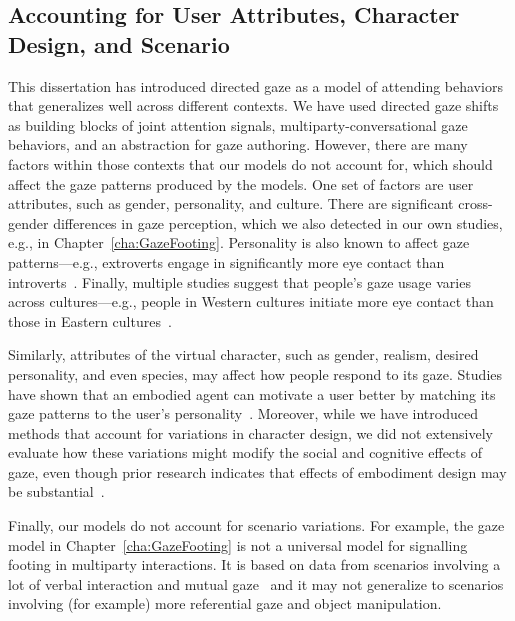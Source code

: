 \subsection{Accounting for User Attributes, Character Design, and Scenario}

This dissertation has introduced directed gaze as a model of attending behaviors that generalizes well across different contexts. We have used directed gaze shifts as building blocks of joint attention signals, multiparty-conversational gaze behaviors, and an abstraction for gaze authoring. However, there are many factors within those contexts that our models do not account for, which should affect the gaze patterns produced by the models. One set of factors are user attributes, such as gender, personality, and culture. There are significant cross-gender differences in gaze perception, which we also detected in our own studies, e.g., in Chapter~\ref{cha:GazeFooting}. Personality is also known to affect gaze patterns---e.g., extroverts engage in significantly more eye contact than introverts~\citep{rutter1972visual}. Finally, multiple studies suggest that people's gaze usage varies across cultures---e.g., people in Western cultures initiate more eye contact than those in Eastern cultures~\citep{mccarthy2006cultural,mccarthy2008gaze}.

Similarly, attributes of the virtual character, such as gender, realism, desired personality, and even species, may affect how people respond to its gaze. Studies have shown that an embodied agent can motivate a user better by matching its gaze patterns to the user's personality~\citep{andrist2015look}. Moreover, while we have introduced methods that account for variations in character design, we did not extensively evaluate how these variations might modify the social and cognitive effects of gaze, even though prior research indicates that effects of embodiment design may be substantial~\citep{parise1996my,baylor2009promoting}.

Finally, our models do not account for scenario variations. For example, the gaze model in Chapter~\ref{cha:GazeFooting} is not a universal model for signalling footing in multiparty interactions. It is based on data from scenarios involving a lot of verbal interaction and mutual gaze~\citep{mutlu2012conversational} and it may not generalize to scenarios involving (for example) more referential gaze and object manipulation.

